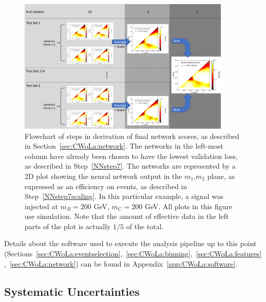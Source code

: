 \begin{figure}[t!]
    \centering
    \includegraphics[width=0.9\textwidth]{figures_CWoLa/split_flowchart.pdf}
    \caption{Flowchart of steps in derivation of final network scores, as described in Section~\ref{sec:CWoLa:network}. The networks in the left-most column have already been chosen to have the lowest validation loss, as described in Step~\ref{NNstep7}. The networks are represented by a 2D plot showing the neural network output in the $m_1$,$m_2$ plane, as expressed as an efficiency on events, as described in Step~\ref{NNstep7scaling}. In this particular example, a signal was injected at $m_B=200$ GeV, $m_C=200$ GeV.  All plots in this figure use simulation.  Note that the amount of effective data in the left parts of the plot is actually $1/5$ of the total.}
    \label{fig:CWoLa:flowchart}
\end{figure}


Details about the software used to execute the analysis pipeline up to this point (Sections~\ref{sec:CWoLa:eventselection},~\ref{sec:CWoLa:binning},~\ref{sec:CWoLa:features},~\ref{sec:CWoLa:network}) can be found in Appendix~\ref{app:CWoLa:software}.

\FloatBarrier
\subsection{Systematic Uncertainties}
\label{sec:CWoLa:systs}

